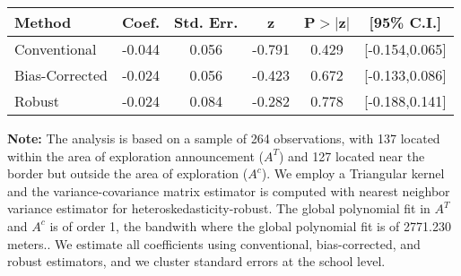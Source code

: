 \begin{table}[htbp]\centering
 \footnotesize 
\begin{tabular}{lccccc}
\hline\hline
Method & Coef. & Std. Err. & z & P$>|$z$|$ & [95\% C.I.] \\ 
\hline \hline  
Conventional & -0.044 & 0.056 & -0.791 & 0.429 & [-0.154,0.065] \\ 
 Bias-Corrected & -0.024 & 0.056 & -0.423 & 0.672 & [-0.133,0.086] \\ 
Robust & -0.024 & 0.084 & -0.282 & 0.778 & [-0.188,0.141] \\ 
  \hline\hline
\end{tabular}
\label{table:rd}
\begin{tablenotes} 
  \justifying \tiny \textbf{Note: }    
   The analysis is based on a sample of 264 observations, with 137 located within the area of exploration announcement ($A^{T}$) and 127 located near the border but outside the area of exploration  ($A^{c}$). 
           We employ a Triangular kernel and the variance-covariance matrix estimator is computed with nearest neighbor variance estimator for heteroskedasticity-robust. The global polynomial fit in  $A^{T}$ and $A^{c}$ is of order 1, the bandwith where the global polynomial fit is of 2771.230 meters.. We estimate all coefficients using conventional, bias-corrected, and robust estimators, and we cluster standard errors at the school level. \end{tablenotes} 
 \end{table} 
